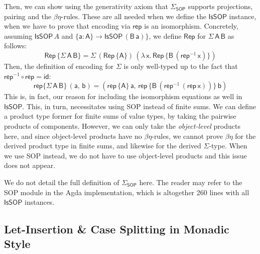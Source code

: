 \documentclass[acmsmall,screen,review,anonymous]{acmart}
\newcommand{\mit}[1]{{\mathsf{#1}}}
\newcommand{\msf}[1]{{\mathsf{#1}}}
\newcommand{\lam}{\lambda\,}
\newcommand{\vA}{\mathsf{A}}
\newcommand{\vB}{\mathsf{B}}
\newcommand{\va}{\mathsf{a}}
\newcommand{\vb}{\mathsf{b}}
\newcommand{\vx}{\mathsf{x}}
\newcommand{\SOP}{\msf{SOP}}
\newcommand{\IsSOP}{\msf{IsSOP}}
\newcommand{\rep}{\msf{rep}}
\theoremstyle{remark}
\newcommand{\id}{\mit{id}}
\newcommand{\Rep}{\mit{Rep}}
\begin{document}
Then, we can show using the generativity axiom that $\Sigma_\SOP$ supports
projections, pairing and the $\beta\eta$-rules. These are all needed when we
define the $\IsSOP$ instance, when we have to prove that encoding via $\rep$
is an isomorphism. Concretely, assuming $\IsSOP\,A$ and $\{\va : \vA\} \to
\IsSOP\,(\vB\,\va)\}$, we define $\Rep$ for $\Sigma\,\vA\,\vB$ as follows:
\[ \Rep\,\{\Sigma\,\vA\,\vB\} = \Sigma\,(\Rep\,\{\vA\})\,(\lam \vx.\,\Rep\,\{\vB\,(\rep^{-1}\,\vx)\}) \]
Then, the definition of encoding for $\Sigma$ is only well-typed up to the fact
that $\rep^{-1} \circ \rep = \id$:
\[  \rep\{\Sigma\,\vA\,\vB\}\,(\va,\,\vb) = (\rep\,\{\vA\}\,\va,\,\rep\,\{\vB\,(\rep^{-1}\,(\rep\,\vx))\}\,\vb) \]
This is, in fact, our reason for including the isomorphism equations as well in
$\IsSOP$. This, in turn, necessitates using SOP instead of finite sums. We can
define a product type former for finite sums of value types, by taking the
pairwise products of components. However, we can only take the
\emph{object-level} products here, and since object-level products have no
$\beta\eta$-rules, we cannot prove $\beta\eta$ for the derived product type in
finite sums, and likewise for the derived $\Sigma$-type. When we use SOP
instead, we do not have to use object-level products and this issue does not
appear.

We do not detail the full definition of $\Sigma_\SOP$ here. The reader may refer
to the SOP module in the Agda implementation, which is altogether 260 lines with
all $\IsSOP$ instances.

\subsection{Let-Insertion \& Case Splitting in Monadic Style}
\end{document}
